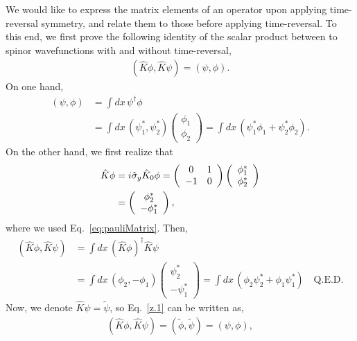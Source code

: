 \documentclass[floatfix,prb,aps,superscriptaddress,11pt]{revtex4}
\begin{document}
We would like to express the matrix elements of an operator upon applying
time-reversal symmetry, and relate them to those before applying
time-reversal.
To this end, we first prove the following identity of the  scalar
product between to spinor wavefunctions with and without time-reversal,
\begin{align}\label{z.1}
(\hat K\phi,\hat K\psi)=(\psi,\phi)  
.  
\end{align}   
On one hand,
\begin{align}\label{z.2}
(\psi,\phi)&
=\int dx\, \psi^\dagger\phi 
\nonumber\\
&=\int dx\, (\psi^*_1,\psi^*_2)  
\left(\begin{array}{c} 
\phi_1\\
\phi_2  
\end{array}\right)  
=
\int dx\, (\psi^*_1\phi_1+\psi^*_2\phi_2)  
. 
\end{align}  
On the other hand, we first realize that
\begin{eqnarray}\label{z.3}
\hat K\phi
&=i\hat{\sigma}_y\hat K_0\phi=
\left(\begin{array}{cc}  
0  & 1 \\  
-1 & 0  
\end{array}\right)  
\left(\begin{array}{c}  
\phi^*_1\\
\phi^*_2
\end{array}\right)   
\nonumber\\
&=
\left(\begin{array}{c} 
\phi^*_2\\
-\phi^*_1
\end{array}\right)  
, 
\end{eqnarray} 
where we used Eq.~\eqref{eq:pauliMatrix}.
Then,  
\begin{align}\label{z.4}
(\hat K\phi,\hat K\psi)&
=\int dx\, (\hat K\phi)^\dagger\hat K\psi 
\nonumber\\
&=\int dx\, (\phi_2,-\phi_1) 
\left(\begin{array}{c} 
\psi^*_2\\
-\psi^*_1 
\end{array}\right)  
=
\int dx\, (\phi_2\psi^*_2+\phi_1\psi^*_1) 
 \quad\mathrm{Q.E.D.}
\end{align} 
Now, we denote $\hat K \psi=\tilde\psi$, so Eq.~\eqref{z.1} can be
written as,
\begin{align}\label{z.5}
(\hat K\phi,\hat K\psi)=(\tilde\phi,\tilde\psi)  =(\psi,\phi)  
,
\end{align}  
\end{document}
